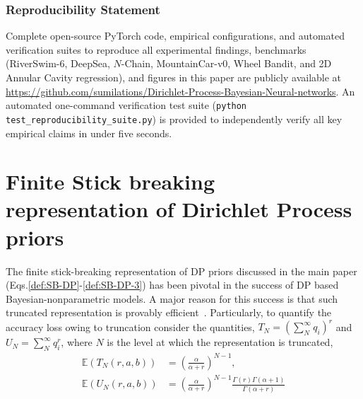 \documentclass[10pt]{article}
\def\E{\mathbb{E}}
\begin{document}


\subsubsection*{Reproducibility Statement}
Complete open-source PyTorch code, empirical configurations, and automated verification suites to reproduce all experimental findings, benchmarks (RiverSwim-6, DeepSea, $N$-Chain, MountainCar-v0, Wheel Bandit, and 2D Annular Cavity regression), and figures in this paper are publicly available at \url{https://github.com/sumilations/Dirichlet-Process-Bayesian-Neural-networks}. An automated one-command verification test suite (\texttt{python test\_reproducibility\_suite.py}) is provided to independently verify all key empirical claims in under five seconds.






\appendix





\section{Finite Stick breaking representation of Dirichlet Process priors}
\label{sec:stick-breaking-finite}

The finite stick-breaking representation of DP priors discussed in the main paper (Eqs.\ref{def:SB-DP}-\ref{def:SB-DP-3}) has been pivotal in the success of DP based Bayesian-nonparametric models. A major reason for this success is that such truncated representation is provably efficient~\citep{ishwaran2001gibbs}. Particularly, to quantify the accuracy loss owing to truncation consider the quantities, $T_{N} = (\sum_{N}^{\infty} q_{i})^{r}$ and $U_{N} = \sum_{N}^{\infty} q_{i}^{r}$, where $N$ is the level at which the representation is truncated,
\begin{align} \label{eq:ishwaran-james-bound}
\E(T_{N}(r,a,b)) &= \left(\frac{\alpha}{\alpha+r}\right)^{N-1} ,\\
\E(U_{N}(r,a,b)) &= \left(\frac{\alpha}{\alpha+r}\right)^{N-1} \frac{\Gamma(r)\Gamma(\alpha + 1)}{\Gamma (\alpha + r)} 
\end{align}
\end{document}

